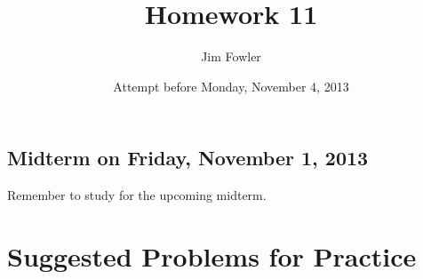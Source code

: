 \documentclass[12pt]{handout}
\title{Homework 11}
\date{Attempt before Monday, November  4, 2013}
\author{Jim Fowler}
\begin{document}
\maketitle






\subsection*{Midterm on Friday, November  1, 2013}
Remember to study for the upcoming midterm.





\section*{Suggested Problems for Practice}
\end{document}

